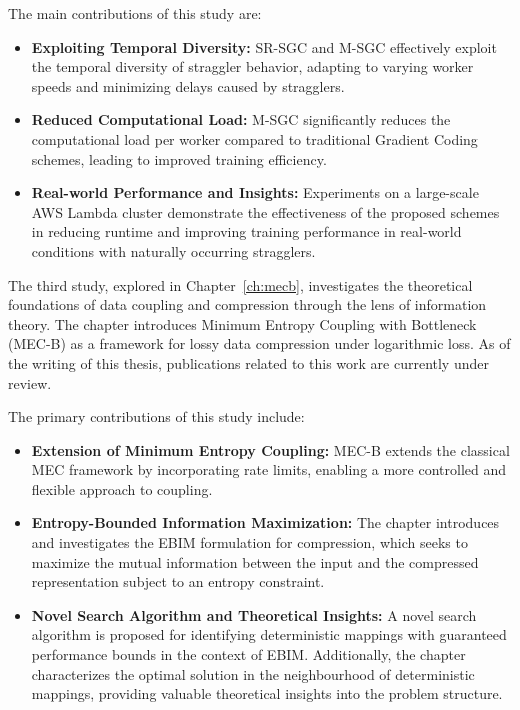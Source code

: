 The main contributions of this study are:

\begin{itemize}
    \item \textbf{Exploiting Temporal Diversity:} SR-SGC and M-SGC effectively exploit the temporal diversity of straggler behavior, adapting to varying worker speeds and minimizing delays caused by stragglers.
    \item \textbf{Reduced Computational Load:} M-SGC significantly reduces the computational load per worker compared to traditional Gradient Coding schemes, leading to improved training efficiency.
    \item \textbf{Real-world Performance and Insights:} Experiments on a large-scale AWS Lambda cluster demonstrate the effectiveness of the proposed schemes in reducing runtime and improving training performance in real-world conditions with naturally occurring stragglers.
\end{itemize}

The third study, explored in Chapter~\ref{ch:mecb}, investigates the theoretical foundations of data coupling and compression through the lens of information theory. The chapter introduces Minimum Entropy Coupling with Bottleneck (MEC-B) as a framework for lossy data compression under logarithmic loss. As of the writing of this thesis, publications related to this work are currently under review.

The primary contributions of this study include: 

\begin{itemize}
    \item \textbf{Extension of Minimum Entropy Coupling:} MEC-B extends the classical MEC framework by incorporating rate limits, enabling a more controlled and flexible approach to coupling.
    \item \textbf{Entropy-Bounded Information Maximization:} The chapter introduces and investigates the EBIM formulation for compression, which seeks to maximize the mutual information between the input and the compressed representation subject to an entropy constraint.
    \item \textbf{Novel Search Algorithm and Theoretical Insights:}  A novel search algorithm is proposed for identifying deterministic mappings with guaranteed performance bounds in the context of EBIM. Additionally, the chapter characterizes the optimal solution in the neighbourhood of deterministic mappings, providing valuable theoretical insights into the problem structure.
\end{itemize} 

